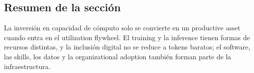 \subsection{Resumen de la sección}

La inversión en capacidad de cómputo solo se convierte en un productive asset cuando entra en el utilization flywheel. El training y la inference tienen formas de recursos distintas, y la inclusión digital no se reduce a tokens baratos; el software, las skills, los datos y la organizational adoption también forman parte de la infraestructura.
